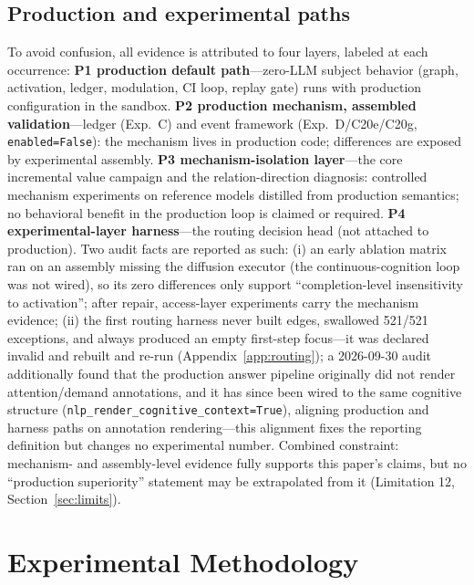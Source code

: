 \documentclass[10pt,a4paper]{article}
\begin{document}
\subsection{Production and experimental paths}
\label{sec:loop-prod}
To avoid confusion, all evidence is attributed to four layers, labeled at each occurrence: \textbf{P1 production default path}---zero-LLM subject behavior (graph, activation, ledger, modulation, CI loop, replay gate) runs with production configuration in the sandbox. \textbf{P2 production mechanism, assembled validation}---ledger (Exp.\ C) and event framework (Exp.\ D/C20e/C20g, \texttt{enabled=False}): the mechanism lives in production code; differences are exposed by experimental assembly. \textbf{P3 mechanism-isolation layer}---the core incremental value campaign and the relation-direction diagnosis: controlled mechanism experiments on reference models distilled from production semantics; no behavioral benefit in the production loop is claimed or required. \textbf{P4 experimental-layer harness}---the routing decision head (not attached to production). Two audit facts are reported as such: (i) an early ablation matrix ran on an assembly missing the diffusion executor (the continuous-cognition loop was not wired), so its zero differences only support ``completion-level insensitivity to activation''; after repair, access-layer experiments carry the mechanism evidence; (ii) the first routing harness never built edges, swallowed 521/521 exceptions, and always produced an empty first-step focus---it was declared invalid and rebuilt and re-run (Appendix~\ref{app:routing}); a 2026-09-30 audit additionally found that the production answer pipeline originally did not render attention/demand annotations, and it has since been wired to the same cognitive structure (\texttt{nlp\_render\_cognitive\_context=True}), aligning production and harness paths on annotation rendering---this alignment fixes the reporting definition but changes no experimental number. Combined constraint: mechanism- and assembly-level evidence fully supports this paper's claims, but no ``production superiority'' statement may be extrapolated from it (Limitation 12, Section~\ref{sec:limits}).

\section{Experimental Methodology}
\label{sec:method}
\end{document}
